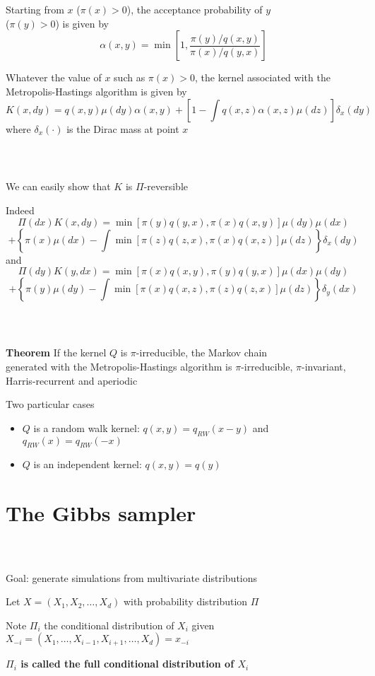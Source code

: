 \documentclass[notes,professionalfont,11pt,usenames,dvipsnames]{beamer}
\newcommand\justify{\rightskip0pt \leftskip0pt}
\newenvironment{slide}
{\begin{frame}[environment=slide]
\frametitle{\insertsection \\ \insertsubsection}\justify\setlength{\parskip}{0.5cm}\vspace{-0.5cm}}
{\end{frame}}
\begin{document}
\begin{slide}

Starting from $x$ ($\pi(x)>0$), the acceptance probability of $y$ \\
($\pi(y)>0$) is given by
$$
\alpha(x,y)=\min\left[1,\frac{\pi(y)\big/q(x,y)}{\pi(x)\big/q(y,x)}\right]
$$

 
Whatever the value of $x$ such as $\pi(x)>0$,
the kernel associated with the Metropolis-Hastings algorithm is given by
$$
K(x,dy)=q(x,y)\mu(dy)\alpha(x,y)+\left[1-\int q(x,z)\alpha(x,z)\mu(dz)\right]\delta_x(dy)
$$
where $\delta_x(\cdot)$ is the Dirac mass at point $x$

\end{slide}

\begin{slide}

We can easily show that $K$ is $\Pi$-reversible

Indeed
$$
\Pi(dx)K(x,dy)=\min\left[\pi(y)q(y,x),\pi(x)q(x,y)\right]\mu(dy)\mu(dx)
$$
$$
+\left\{\pi(x)\mu(dx)-\int \min\left[\pi(z)q(z,x),\pi(x)q(x,z)\right]\mu(dz)\right\}\delta_x(dy)
$$
and
$$
\Pi(dy)K(y,dx)=\min\left[\pi(x)q(x,y),\pi(y)q(y,x)\right]\mu(dx)\mu(dy)
$$
$$
+\left\{\pi(y)\mu(dy)-\int \min\left[\pi(x)q(x,z),\pi(z)q(z,x)\right]\mu(dz)\right\}\delta_y(dx)
$$

\end{slide}

\begin{slide}

{\bf Theorem} If the kernel $Q$ is $\pi$-irreducible, the Markov chain \\
generated
with the Metropolis-Hastings algorithm is $\pi$-irreducible, $\pi$-invariant, Harris-recurrent
and aperiodic


Two particular cases \begin{itemize}
\item $Q$ is a random walk kernel: $q(x,y)=q_{RW}(x-y)$ and $q_{RW}(x)=q_{RW}(-x)$
\item $Q$ is an independent kernel: $q(x,y)=q(y)$
\end{itemize}

\end{slide}

\section{The Gibbs sampler}

\begin{slide}

Goal: generate simulations from multivariate distributions

Let $X=(X_1,X_2,\ldots,X_d)$ with probability distribution $\Pi$

Note $\Pi_i$ the conditional distribution of $X_i$ given \\
$X_{-i}=(X_1,\ldots,X_{i-1},X_{i+1},\ldots,X_d)=x_{-i}$

{\bf $\Pi_i$ is called the full conditional distribution of $X_i$}

\end{slide}
\end{document}
